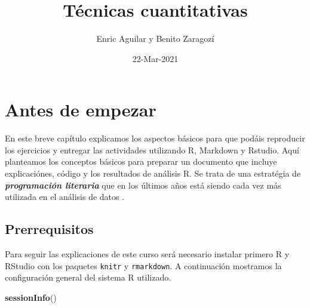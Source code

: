 \documentclass[
]{book}
\title{Técnicas cuantitativas}
\author{Enric Aguilar y Benito Zaragozí}
\date{22-Mar-2021}
\newenvironment{Shaded}{\begin{snugshade}}{\end{snugshade}}
\newcommand{\KeywordTok}[1]{\textcolor[rgb]{0.13,0.29,0.53}{\textbf{#1}}}
\newcommand{\NormalTok}[1]{#1}
\begin{document}
\maketitle

{
\setcounter{tocdepth}{1}
\tableofcontents
}
\hypertarget{antes-de-empezar}{%
\chapter*{Antes de empezar}\label{antes-de-empezar}}

En este breve capítulo explicamos los aspectos básicos para que podáis reproducir los ejercicios y entregar las actividades utilizando R, Markdown y Rstudio. Aquí planteamos los conceptos básicos para preparar un documento que incluye explicaciónes, código y los resultados de análisis R. Se trata de una estratégia de \textbf{\emph{programación literaria}} que en los últimos años está siendo cada vez más utilizada en el análisis de datos \citep{knuth1984literate, xie2015knitr}.

\hypertarget{prerrequisitos}{%
\section{Prerrequisitos}\label{prerrequisitos}}

Para seguir las explicaciones de este curso será necesario instalar primero R y RStudio con los paquetes \texttt{knitr} y \texttt{rmarkdown}. A continuación mostramos la configuración general del sistema R utilizado.

\begin{Shaded}
\begin{Highlighting}[]
\KeywordTok{sessionInfo}\NormalTok{()}
\end{Highlighting}
\end{Shaded}
\end{document}

